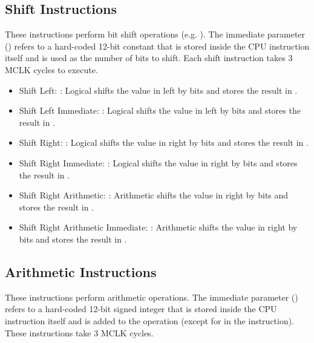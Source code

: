 \documentclass[11pt,pdftex,portrait,letterpaper]{article}
\begin{document}
\subsection{Shift Instructions}

These instructions perform bit shift operations (e.g. \cinline{<<}). The immediate parameter () refers to a hard-coded 12-bit constant that is stored inside the CPU instruction itself and is used as the number of bits to shift. Each shift instruction takes 3 MCLK cycles to execute.

\begin{itemize}
	\item Shift Left: : Logical shifts the value in  left by  bits and stores the result in .
	\item Shift Left Immediate: : Logical shifts the value in  left by  bits and stores the result in .
	\item Shift Right: : Logical shifts the value in  right by  bits and stores the result in .
	\item Shift Right Immediate: : Logical shifts the value in  right by  bits and stores the result in .
	\item Shift Right Arithmetic: : Arithmetic shifts the value in  right by  bits and stores the result in .
	\item Shift Right Arithmetic Immediate: : Arithmetic shifts the value in  right by  bits and stores the result in .
\end{itemize}

\subsection{Arithmetic Instructions}

These instructions perform arithmetic operations. The immediate parameter () refers to a hard-coded 12-bit signed integer that is stored inside the CPU instruction itself and is added to the operation (except for in the  instruction). These instructions take 3 MCLK cycles.
\end{document}
